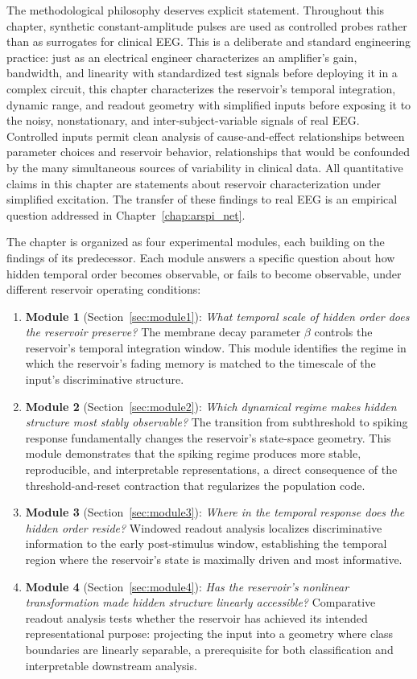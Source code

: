 The methodological philosophy deserves explicit statement. Throughout this chapter, synthetic constant-amplitude pulses are used as controlled probes rather than as surrogates for clinical EEG. This is a deliberate and standard engineering practice: just as an electrical engineer characterizes an amplifier's gain, bandwidth, and linearity with standardized test signals before deploying it in a complex circuit, this chapter characterizes the reservoir's temporal integration, dynamic range, and readout geometry with simplified inputs before exposing it to the noisy, nonstationary, and inter-subject-variable signals of real EEG. Controlled inputs permit clean analysis of cause-and-effect relationships between parameter choices and reservoir behavior, relationships that would be confounded by the many simultaneous sources of variability in clinical data. All quantitative claims in this chapter are statements about reservoir characterization under simplified excitation. The transfer of these findings to real EEG is an empirical question addressed in Chapter~\ref{chap:arspi_net}.

The chapter is organized as four experimental modules, each building on the findings of its predecessor. Each module answers a specific question about how hidden temporal order becomes observable, or fails to become observable, under different reservoir operating conditions:
\begin{enumerate}
    \item \textbf{Module 1} (Section~\ref{sec:module1}): \emph{What temporal scale of hidden order does the reservoir preserve?} The membrane decay parameter $\beta$ controls the reservoir's temporal integration window. This module identifies the regime in which the reservoir's fading memory is matched to the timescale of the input's discriminative structure.
    \item \textbf{Module 2} (Section~\ref{sec:module2}): \emph{Which dynamical regime makes hidden structure most stably observable?} The transition from subthreshold to spiking response fundamentally changes the reservoir's state-space geometry. This module demonstrates that the spiking regime produces more stable, reproducible, and interpretable representations, a direct consequence of the threshold-and-reset contraction that regularizes the population code.
    \item \textbf{Module 3} (Section~\ref{sec:module3}): \emph{Where in the temporal response does the hidden order reside?} Windowed readout analysis localizes discriminative information to the early post-stimulus window, establishing the temporal region where the reservoir's state is maximally driven and most informative.
    \item \textbf{Module 4} (Section~\ref{sec:module4}): \emph{Has the reservoir's nonlinear transformation made hidden structure linearly accessible?} Comparative readout analysis tests whether the reservoir has achieved its intended representational purpose: projecting the input into a geometry where class boundaries are linearly separable, a prerequisite for both classification and interpretable downstream analysis.
\end{enumerate}

